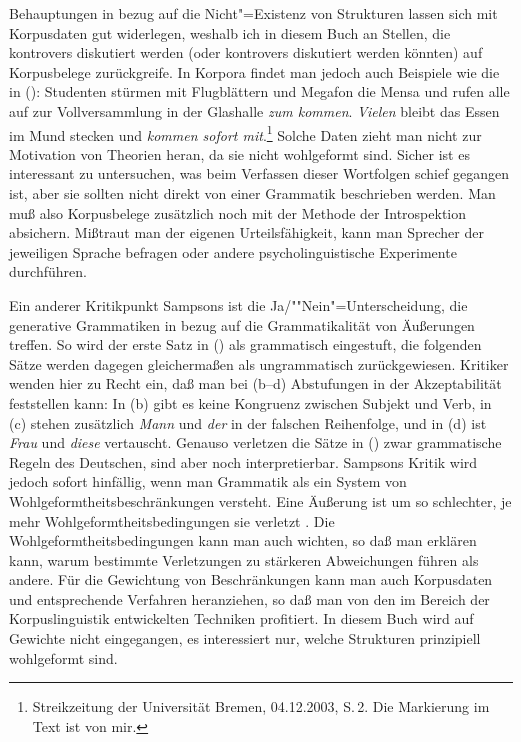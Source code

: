 Behauptungen in bezug auf die Nicht"=Existenz von Strukturen lassen sich mit Korpusdaten gut widerlegen,
weshalb ich in diesem Buch an Stellen, die kontrovers diskutiert werden (oder kontrovers diskutiert
werden könnten) auf Korpusbelege zurückgreife. In Korpora findet man jedoch auch Beispiele wie die in ():
\ea
Studenten stürmen mit Flugblättern und Megafon die Mensa und rufen alle auf zur Vollversammlung
in der Glashalle \emph{zum kommen}. \emph{Vielen} bleibt das Essen im Mund stecken und \emph{kommen sofort mit}.\footnote{
  Streikzeitung der Universität Bremen, 04.12.2003, S.\,2. Die Markierung im Text ist von mir.%
}
\z
Solche Daten zieht man nicht zur Motivation von Theorien heran, da sie nicht wohlgeformt sind.
Sicher ist es interessant zu untersuchen, was beim Verfassen dieser Wortfolgen schief gegangen ist, aber
sie sollten nicht direkt von einer Grammatik beschrieben werden. Man muß also Korpusbelege zusätzlich
noch mit der Methode der Introspektion absichern. Mißtraut man der eigenen Urteilsfähigkeit, kann
man Sprecher der jeweiligen Sprache befragen oder andere psycholinguistische Experimente
durchführen.

Ein anderer Kritikpunkt Sampsons ist die Ja/""Nein"=Unterscheidung, die generative Grammatiken in bezug
auf die Grammatikalität von Äußerungen treffen. So wird der erste Satz in () als grammatisch eingestuft,
die folgenden Sätze werden dagegen gleichermaßen als ungrammatisch zurückgewiesen.
\eal
{}
\zl
Kritiker wenden hier zu Recht ein, daß man bei (b--d) Abstufungen in der Akzeptabilität
feststellen kann: In (b) gibt es keine Kongruenz zwischen Subjekt und Verb, in (c)
stehen zusätzlich \emph{Mann} und \emph{der} in der falschen Reihenfolge, und in (d) ist \emph{Frau}
und \emph{diese} vertauscht. Genauso verletzen die Sätze in () zwar grammatische
Regeln des Deutschen, sind aber noch interpretierbar.
Sampsons Kritik wird jedoch sofort hinfällig, wenn man Grammatik als ein System
von Wohlgeformtheitsbeschränkungen versteht. Eine Äußerung ist um so schlechter,
je mehr Wohlgeformtheitsbedingungen sie verletzt \citep[--27]{PS2001a}. Die
Wohlgeformtheitsbedingungen kann man auch wichten, 
so daß man erklären kann, warum bestimmte Verletzungen zu stärkeren Abweichungen führen als andere.
Für die Gewichtung von Beschränkungen kann man auch Korpusdaten und entsprechende Verfahren
heranziehen, so daß man von den im Bereich der Korpuslinguistik entwickelten Techniken profitiert.
In diesem Buch wird auf Gewichte nicht eingegangen,
es interessiert nur, welche Strukturen prinzipiell wohlgeformt sind.






